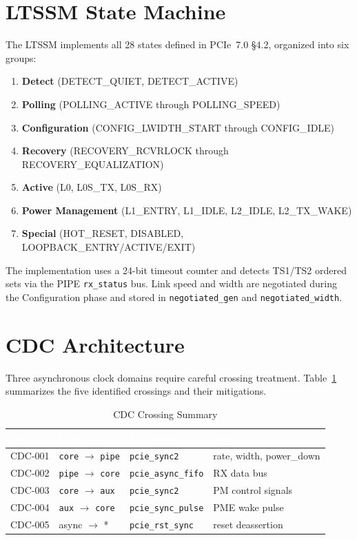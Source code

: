 \documentclass[12pt,a4paper]{report}
\newcommand{\theadcell}[1]{%
  \cellcolor{tablehead}\textcolor{white}{\textbf{#1}}}
\begin{document}
\section{LTSSM State Machine}

The LTSSM implements all 28 states defined in PCIe~7.0 \S4.2,
organized into six groups:

\begin{enumerate}[noitemsep,label=\arabic*.]
  \item \textbf{Detect} (DETECT\_QUIET, DETECT\_ACTIVE)
  \item \textbf{Polling} (POLLING\_ACTIVE through POLLING\_SPEED)
  \item \textbf{Configuration} (CONFIG\_LWIDTH\_START through CONFIG\_IDLE)
  \item \textbf{Recovery} (RECOVERY\_RCVRLOCK through RECOVERY\_EQUALIZATION)
  \item \textbf{Active} (L0, L0S\_TX, L0S\_RX)
  \item \textbf{Power Management} (L1\_ENTRY, L1\_IDLE, L2\_IDLE, L2\_TX\_WAKE)
  \item \textbf{Special} (HOT\_RESET, DISABLED, LOOPBACK\_ENTRY/ACTIVE/EXIT)
\end{enumerate}

The implementation uses a 24-bit timeout counter and detects TS1/TS2 ordered
sets via the PIPE \texttt{rx\_status} bus. Link speed and width are negotiated
during the Configuration phase and stored in \texttt{negotiated\_gen} and
\texttt{negotiated\_width}.

\section{CDC Architecture}

Three asynchronous clock domains require careful crossing treatment.
Table~\ref{tab:cdc} summarizes the five identified crossings and their mitigations.

\begin{table}[H]
\centering
\caption{CDC Crossing Summary}
\label{tab:cdc}
\begin{tabular}{lllp{4.5cm}}
  \toprule
  \theadcell{ID} & \theadcell{Crossing} & \theadcell{Primitive} & \theadcell{Signals} \\
  \midrule
  CDC-001 & \texttt{core} $\to$ \texttt{pipe} & \texttt{pcie\_sync2} & rate, width, power\_down \\
  CDC-002 & \texttt{pipe} $\to$ \texttt{core} & \texttt{pcie\_async\_fifo} & RX data bus \\
  CDC-003 & \texttt{core} $\to$ \texttt{aux}  & \texttt{pcie\_sync2} & PM control signals \\
  CDC-004 & \texttt{aux}  $\to$ \texttt{core} & \texttt{pcie\_sync\_pulse} & PME wake pulse \\
  CDC-005 & async $\to$ * & \texttt{pcie\_rst\_sync} & reset deassertion \\
  \bottomrule
\end{tabular}
\end{table}
\end{document}
